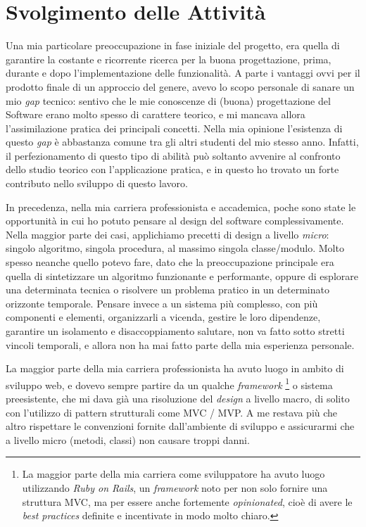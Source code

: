 \documentclass[12pt]{report}
\begin{document}
% 
% 
\chapter{Svolgimento delle Attività}
\label{cap3}

Una mia particolare preoccupazione in fase iniziale del progetto, era quella di garantire la costante e ricorrente ricerca per la buona progettazione, prima, durante e dopo l'implementazione delle funzionalità. A parte i vantaggi ovvi per il prodotto finale di un approccio del genere, avevo lo scopo personale di sanare un mio \textit{gap} tecnico: sentivo che le mie conoscenze di (buona) progettazione del Software erano molto spesso di carattere teorico, e mi mancava allora l'assimilazione pratica dei principali concetti. Nella mia opinione l'esistenza di questo \textit{gap} è abbastanza comune tra gli altri studenti del mio stesso anno. Infatti, il perfezionamento di questo tipo di abilità può soltanto avvenire al confronto dello studio teorico con l'applicazione pratica, e in questo ho trovato un forte contributo nello sviluppo di questo lavoro.

In precedenza, nella mia carriera professionista e accademica, poche sono state le opportunità in cui ho potuto pensare al design del software complessivamente. Nella maggior parte dei casi, applichiamo precetti di design a livello \textit{micro}: singolo algoritmo, singola procedura, al massimo singola classe/modulo. Molto spesso neanche quello potevo fare, dato che la preoccupazione principale era quella di sintetizzare un algoritmo funzionante e performante, oppure di esplorare una determinata tecnica o risolvere un problema pratico in un determinato orizzonte temporale. Pensare invece a un sistema più complesso, con più componenti e elementi, organizzarli a vicenda, gestire le loro dipendenze, garantire un isolamento e disaccoppiamento salutare, non va fatto sotto stretti vincoli temporali, e allora non ha mai fatto parte della mia esperienza personale. 

La maggior parte della mia carriera professionista ha avuto luogo in ambito di sviluppo web, e dovevo sempre partire da un qualche \textit{framework}
\footnote{La maggior parte della mia carriera come sviluppatore ha avuto luogo utilizzando \textit{Ruby on Rails}, un \textit{framework} noto per non solo fornire una struttura MVC, ma per essere anche fortemente \textit{opinionated}, cioè di avere le \textit{best practices} definite e incentivate in modo molto chiaro.} 
o sistema preesistente, che mi dava già una risoluzione del \textit{design} a livello macro, di solito con l'utilizzo di pattern strutturali come MVC / MVP. A me restava più che altro rispettare le convenzioni fornite dall'ambiente di sviluppo e assicurarmi che a livello micro (metodi, classi) non causare troppi danni.
\end{document}
